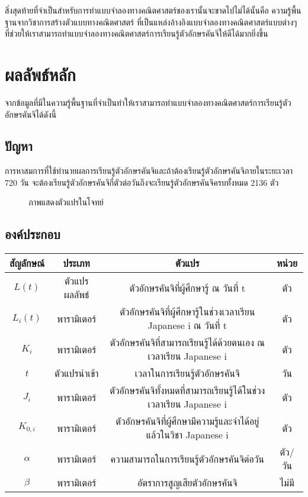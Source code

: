 \documentclass{article}
\begin{document}
สิ่งสุดท้ายที่จำเป็นสำหรับการทำแบบจำลองทางคณิตศาสตร์ของเรานั้นจะขาดไปไม่ได้นั้นคือ ความรู้พื้นฐานจากวิชาการสร้างตัวแบบทางคณิตศาสตร์\cite{MathematicalModeling} ที่เป็นแหล่งอ้างอิงแบบจำลองทางคณิตศาสตร์แบบต่างๆ ที่ช่วยให้เราสามารถทำแบบจำลองทางคณิตศาสตร์การเรียนรู้ตัวอักษรคันจิให้ดีได้มากยิ่งขึ้น

\section{ผลลัพธ์หลัก}
จากข้อมูลที่มีในความรู้พื้นฐานที่จำเป็นทำให้เราสามารถทำแบบจำลองทางคณิตศาสตร์การเรียนรู้ตัวอักษรคันจิได้ดังนี้
\subsection{ปัญหา} 
การหาสมการที่ใช้ทำนายผลการเรียนรู้ตัวอักษรคันจิและถ้าต้องเรียนรู้ตัวอักษรคันจิภายในระยะเวลา 720 วัน จะต้องเรียนรู้ตัวอักษรคันจิกี่ตัวต่อวันถึงจะเรียนรู้ตัวอักษรคันจิครบทั้งหมด 2136 ตัว
\begin{figure}[h!]
\centering
\caption{ภาพแสดงตัวแปรในโจทย์}
\label{fig:inoutput}
\end{figure}
\subsection{องค์ประกอบ}
\begin{center}
\begin{tabular}{ |c|c|c|c| }
\hline
\textbf{สัญลักษณ์ } & \textbf{ประเภท } & \textbf{ตัวแปร } & \textbf{หน่วย } \\
\hline
$L(t)$ & ตัวแปรผลลัพธ์ & ตัวอักษรคันจิที่ผู้ศึกษารู้ ณ วันที่ t & ตัว \\
\hline
$L_i(t)$ & พารามิเตอร์ & ตัวอักษรคันจิที่ผู้ศึกษารู้ในช่วงเวลาเรียน Japanese i ณ วันที่ t & ตัว \\
\hline
$K_i$ & พารามิเตอร์ & ตัวอักษรคันจิที่สามารถเรียนรู้ได้ด้วยตนเอง ณ เวลาเรียน Japanese i & ตัว \\
\hline
$t$ & ตัวแปรนำเข้า & เวลาในการเรียนรู้ตัวอักษรคันจิ & วัน \\
\hline 
$J_i$ & พารามิเตอร์ & ตัวอักษรคันจิทั้งหมดที่สามารถเรียนรู้ได้ในช่วงเวลาเรียน Japanese i & ตัว \\
\hline
$K_{0,i}$ & พารามิเตอร์ & ตัวอักษรคันจิที่ผู้ศึกษามีความรู้และจำได้อยู่แล้วในวิชา Japanese i & ตัว \\
\hline
$\alpha$ & พารามิเตอร์ & ความสามารถในการเรียนรู้ตัวอักษรคันจิต่อวัน & ตัว/วัน \\
\hline 
$\beta $ & พารามิเตอร์ & อัตราการสูญเสียตัวอักษรคันจิ & ไม่มี \\
\hline 
\end{tabular}
\end{center}
\end{document}
